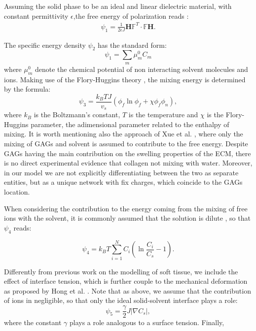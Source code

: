 \documentclass[runningheads]{llncs}
\newcommand{\F}{\ensuremath{\mathbb{F}}}
\begin{document}
Assuming the solid phase to be an ideal and linear dielectric material, with constant permittivity $\epsilon$,the free energy of polarization reads \cite{DROZDOV+,Reviewpolyel}:
\begin{gather}
\psi_1 = \frac{1}{2\epsilon J} \mathbf{H}\F^T \cdot \F \mathbf{H}.
\end{gather}

The specific energy density $\psi_2$ has the standard form:
\begin{equation}
\psi_1 = \sum\limits_{m} \mu^0_m C_m
\end{equation} 
where $\mu^0_m$ denote the chemical potential of non interacting solvent molecules and ions. Making use of the Flory-Huggins theory \cite{flory,hug}, the mixing energy is determined by the formula:
\begin{equation}
\psi_3 = \frac{k_B T J}{v_s} \left(\phi_f \ln \phi_f + \chi \phi_f \phi_n\right),
\end{equation}
where $k_B$ is the Boltzmann's constant, $T$ is the temperature and $\chi$ is the Flory-Huggins parameter, the adimensional parameter related to the enthalpy of mixing. It is worth mentioning also the approach of Xue et al. \cite{ecm1,ecm2}, where only the mixing of GAGs and solvent is assumed to contribute to the free energy. Despite GAGs having the main contribution on the swelling properties of the ECM, there is no direct experimental evidence that collagen not mixing with water. Moreover, in our model we are not explicitly differentiating between the two as separate entities, but as a unique network with fix charges, which coincide to the GAGs location.

When considering the contribution to the energy coming from the mixing of free ions with the solvent, it is commonly assumed that the solution is dilute \cite{Reviewpolyel,ecm1,ecm2}, so that $\psi_4$ reads:

\begin{equation}
\psi_4 = k_B T \sum\limits_{i=1}^{N} C_i \left(\ln \frac{C_i}{ C_s}-1\right).
\end{equation}

Differently from previous work on the modelling of soft tissue, we include the effect of interface tension, which is further couple to the mechanical deformation as proposed by Hong et al. \cite{Interface}. Note that as above, we assume that the contribution of ions in negligible, so that only the ideal solid-solvent interface plays a role:
\begin{equation}
\psi_5 = \frac{\gamma}{2} J \left|\nabla C_s\right|,
\end{equation}
where the constant $\gamma$ plays a role analogous to a surface tension.
Finally, 

\newpage


%
\end{document}
